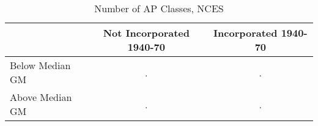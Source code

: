 \begin{table}[htbp]\centering
\caption{Number of AP Classes, NCES}
\begin{tabular}{l*{2}{c}}
\hline\hline
                    &Not Incorporated 1940-70&Incorporated 1940-70\\
\hline
Below Median GM     &           .&           .\\
Above Median GM     &           .&           .\\
\hline\hline
\end{tabular}
\end{table}
